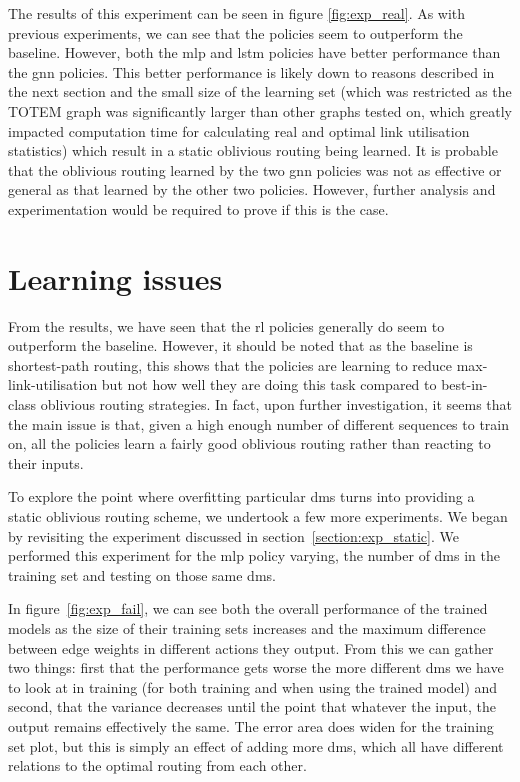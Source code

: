 The results of this experiment can be seen in figure \ref{fig:exp_real}. As with previous experiments, we can see that the policies seem to outperform the baseline. However, both the \ac{mlp} and \ac{lstm} policies have better performance than the \ac{gnn} policies. This better performance is likely down to reasons described in the next section and the small size of the learning set (which was restricted as the TOTEM graph was significantly larger than other graphs tested on, which greatly impacted computation time for calculating real and optimal link utilisation statistics) which result in a static oblivious routing being learned. It is probable that the oblivious routing learned by the two \ac{gnn} policies was not as effective or general as that learned by the other two policies. However, further analysis and experimentation would be required to prove if this is the case.


\section{Learning issues}
\label{section:overfit}
From the results, we have seen that the \ac{rl} policies generally do seem to outperform the baseline. However, it should be noted that as the baseline is shortest-path routing, this shows that the policies are learning to reduce max-link-utilisation but not how well they are doing this task compared to best-in-class oblivious routing strategies. In fact, upon further investigation, it seems that the main issue is that, given a high enough number of different sequences to train on, all the policies learn a fairly good oblivious routing rather than reacting to their inputs.

To explore the point where overfitting particular \acp{dm} turns into providing a static oblivious routing scheme, we undertook a few more experiments. We began by revisiting the experiment discussed in section~\ref{section:exp_static}. We performed this experiment for the \ac{mlp} policy varying, the number of \acp{dm} in the training set and testing on those same \acp{dm}.

In figure~\ref{fig:exp_fail}, we can see both the overall performance of the trained models as the size of their training sets increases and the maximum difference between edge weights in different actions they output. From this we can gather two things: first that the performance gets worse the more different \acp{dm} we have to look at in training (for both training and when using the trained model) and second, that the variance decreases until the point that whatever the input, the output remains effectively the same. The error area does widen for the training set plot, but this is simply an effect of adding more \acp{dm}, which all have different relations to the optimal routing from each other.

